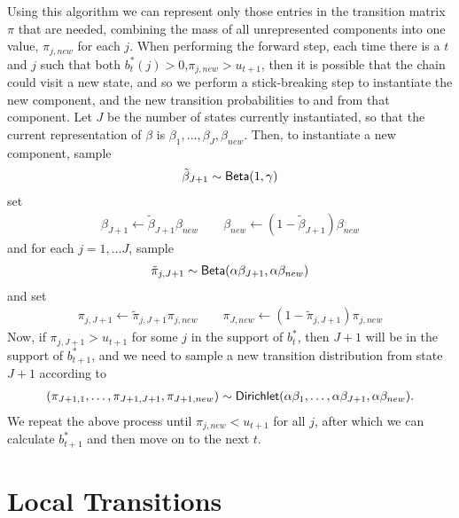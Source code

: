 Using this algorithm we can represent only those entries in the
transition matrix $\pi$ that are needed, combining the mass of all
unrepresented components into one value, $\pi_{j,new}$ for each
$j$.  When performing the forward step, each time there is a $t$ and
$j$ such that both $b^*_{t}(j) > 0$,$\pi_{j,new} > u_{t+1}$, then it is possible that the chain could visit a
new state, and so we perform a stick-breaking step to instantiate the
new component, and the new transition probabilities to and from that
component.  Let $J$ be the number of states currently instantiated, so
that the current representation of $\beta$ is $\beta_1, \dots,
\beta_J, \beta_{new}$.  Then, to instantiate a new component, sample
\begin{align}
  \tilde{\beta}_{J+1} \sim \mathsf{Beta}(1,\gamma)
\end{align}
set
\begin{align}
  \beta_{J+1} \gets \tilde{\beta}_{J+1} \beta_{new} \qquad \beta_{new}
  \gets (1 - \tilde{\beta}_{J+1}) \beta_{new}
\end{align}
and for each $j = 1, \dots J$, sample
\begin{align}
  \tilde{\pi}_{j,J+1} \sim \mathsf{Beta}(\alpha \beta_{J+1},\alpha \beta_{new})
\end{align}
and set
\begin{align}
  \pi_{j,J+1} \gets \tilde{\pi}_{j,J+1} \pi_{j,new} \qquad \pi_{J,new}
  \gets (1 - \tilde{\pi}_{j,J+1}) \pi_{j,new}
\end{align}
Now, if $\pi_{j,J+1} > u_{t+1}$ for some $j$ in the support of
$b^*_t$, then $J+1$ will be in the support of $b^*_{t+1}$, and we need
to sample a new transition distribution from state $J+1$ according to
\begin{align}
  (\pi_{J+1,1}, \dots, \pi_{J+1,J+1}, \pi_{J+1,new}) \sim \mathsf{Dirichlet}(\alpha
    \beta_1, \dots, \alpha \beta_{J+1}, \alpha \beta_{new}).
\end{align}
We repeat the above process until $\pi_{j,new} < u_{t+1}$ for all $j$,
after which we can calculate $b^*_{t+1}$ and then move on to the next $t$.

\section{Local Transitions}
\label{sec:local-transitions}

